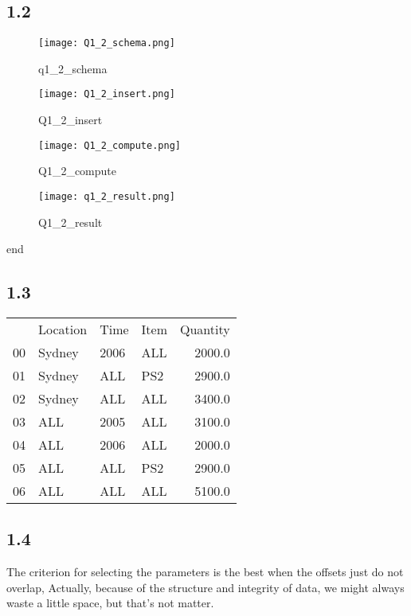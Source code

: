 \documentclass[a4paper,12pt]{article}
\begin{document}
\subsection*{1.2}

\begin{figure}[h!]
\centering
\texttt{[image: Q1\_2\_schema.png]}
\caption{q1\_2\_schema \label{overflow}}
\end{figure}

\begin{figure}[h!]
\centering
\texttt{[image: Q1\_2\_insert.png]}
\caption{Q1\_2\_insert \label{overflow}}
\end{figure}

\begin{figure}[h!]
\centering
\texttt{[image: Q1\_2\_compute.png]}
\caption{Q1\_2\_compute \label{overflow}}
\end{figure}

\begin{figure}[h!]
\centering
\texttt{[image: q1\_2\_result.png]}
\caption{Q1\_2\_result \label{overflow}}
\end{figure}

end

\newpage
\subsection*{1.3}
\begin{tabular}{llllr}
{} & Location &  Time & Item &  Quantity \\
00  &   Sydney &  2006 &  ALL &    2000.0 \\
01  &   Sydney &  ALL  &  PS2 &    2900.0 \\
02  &   Sydney &  ALL  &  ALL &    3400.0 \\
03  &      ALL &  2005 &  ALL &    3100.0 \\
04  &      ALL &  2006 &  ALL &    2000.0 \\
05  &      ALL &  ALL  &  PS2 &    2900.0 \\
06  &      ALL &  ALL  &  ALL &    5100.0 \\
\end{tabular}



\subsection*{1.4}

The criterion for selecting the parameters is the best when the offsets just do not overlap, Actually, because of the structure and integrity of data, we might always waste a little space, but that's not matter.
\end{document}
